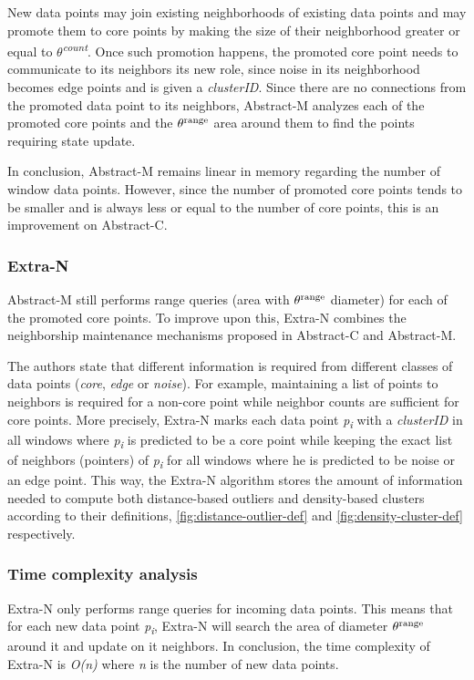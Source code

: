New data points may join existing neighborhoods of existing data points and may promote them to core points by making the size of their neighborhood greater or equal to \textit{$\theta$\textsuperscript{count}}. Once such promotion happens, the promoted core point needs to communicate to its neighbors its new role, since noise in its neighborhood becomes edge points and is given a \textit{clusterID}. Since there are no connections from the promoted data point to its neighbors, Abstract-M analyzes each of the promoted core points and the $\theta\textsuperscript{range}$ area around them to find the points requiring state update. 

In conclusion, Abstract-M remains linear in memory regarding the number of window data points. However, since the number of promoted core points tends to be smaller and is always less or equal to the number of core points, this is an improvement on Abstract-C.

\subsubsection{Extra-N}

Abstract-M still performs range queries (area with $\theta\textsuperscript{range}$ diameter) for each of the promoted core points. To improve upon this, Extra-N combines the neighborship maintenance mechanisms proposed in Abstract-C and Abstract-M.

The authors state that different information is required from different classes of data points (\textit{core}, \textit{edge} or \textit{noise}). For example, maintaining a list of points to neighbors is required for a non-core point while neighbor counts are sufficient for core points. More precisely, Extra-N marks each data point \textit{p\textsubscript{i}} with a \textit{clusterID} in all windows where \textit{p\textsubscript{i}} is predicted to be a core point while keeping the exact list of neighbors (pointers) of \textit{p\textsubscript{i}} for all windows where he is predicted to be noise or an edge point. This way, the Extra-N algorithm stores the amount of information needed to compute both distance-based outliers and density-based clusters according to their definitions, \ref{fig:distance-outlier-def} and \ref{fig:density-cluster-def} respectively.

\subsubsection{Time complexity analysis}
Extra-N only performs range queries for incoming data points. This means that for each new data point \textit{p\textsubscript{i}}, Extra-N will search the area of diameter $\theta\textsuperscript{range}$ around it and update on it neighbors. In conclusion, the time complexity of Extra-N is \textit{O(n)} where \textit{n} is the number of new data points. 

